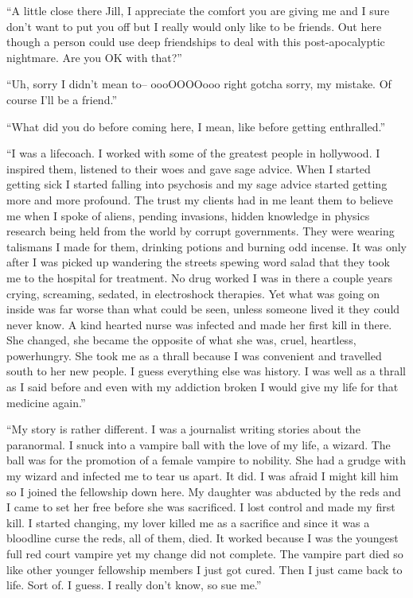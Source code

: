 ``A little close there Jill, I appreciate the comfort you are giving me and I sure don't want to put you off but I really would only like to be friends. Out here though a person could use deep friendships to deal with this post-apocalyptic nightmare. Are you OK with that?''

``Uh, sorry I didn't mean to-- oooOOOOooo right gotcha sorry, my mistake. Of course I'll be a friend.''

``What did you do before coming here, I mean, like before getting enthralled.''

``I was a lifecoach. I worked with some of the greatest people in hollywood. I inspired them, listened to their woes and gave sage advice. When I started getting sick I started falling into psychosis and my sage advice started getting more and more profound. The trust my clients had in me leant them to believe me when I spoke of aliens, pending invasions, hidden knowledge in physics research being held from the world by corrupt governments. They were wearing talismans I made for them, drinking potions and burning odd incense. It was only after I was picked up wandering the streets spewing word salad that they took me to the hospital for treatment. No drug worked I was in there a couple years crying, screaming, sedated, in electroshock therapies. Yet what was going on inside was far worse than what could be seen, unless someone lived it they could never know. A kind hearted nurse was infected and made her first kill in there. She changed, she became the opposite of what she was, cruel, heartless, powerhungry. She took me as a thrall because I was convenient and travelled south to her new people. I guess everything else was history. I was well as a thrall as I said before and even with my addiction broken I would give my life for that medicine again.''

``My story is rather different. I was a journalist writing stories about the paranormal. I snuck into a vampire ball with the love of my life, a wizard. The ball was for the promotion of a female vampire to nobility. She had a grudge with my wizard and infected me to tear us apart. It did. I was afraid I might kill him so I joined the fellowship down here. My daughter was abducted by the reds and I came to set her free before she was sacrificed. I lost control and made my first kill. I started changing, my lover killed me as a sacrifice and since it was a bloodline curse the reds, all of them, died. It worked because I was the youngest full red court vampire yet my change did not complete.  The vampire part died so like other younger fellowship members I just got cured. Then I just came back to life. Sort of. I guess. I really don't know, so sue me.''

